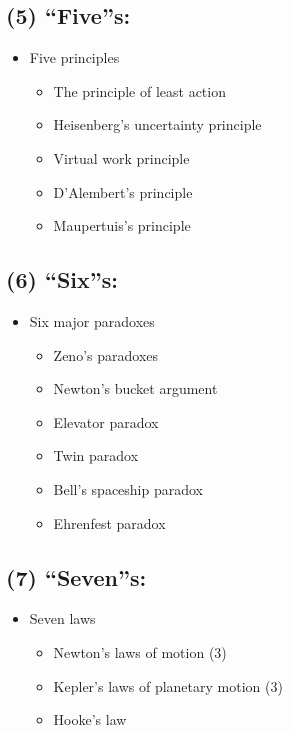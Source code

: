\subsection*{(5) ``Five''s:}\label{fives}

\begin{itemize}
\tightlist{}
\item
  Five principles

  \begin{itemize}
\tightlist{}
  \item
    The principle of least action
  \item
    Heisenberg's uncertainty principle
  \item
    Virtual work principle
  \item
    D'Alembert's principle
  \item
    Maupertuis's principle
  \end{itemize}
\end{itemize}

\subsection*{(6) ``Six''s:}\label{sixs}

\begin{itemize}
\tightlist{}
\item
  Six major paradoxes

  \begin{itemize}
\tightlist{}
  \item
    Zeno's paradoxes
  \item
    Newton's bucket argument
  \item
    Elevator paradox
  \item
    Twin paradox
  \item
    Bell's spaceship paradox
  \item
    Ehrenfest paradox
  \end{itemize}
\end{itemize}

\subsection*{(7) ``Seven''s:}\label{sevens}

\begin{itemize}
\tightlist{}
\item
  Seven laws

  \begin{itemize}
\tightlist{}
  \item
    Newton's laws of motion (3)
  \item
    Kepler's laws of planetary motion (3)
  \item
    Hooke's law
  \end{itemize}
\end{itemize}

